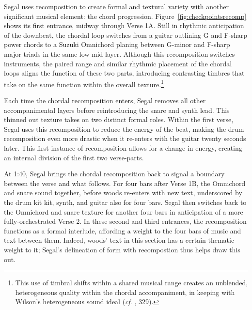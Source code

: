 Segal uses recomposition to create formal and textural variety with another significant musical 
element: the chord progression. Figure~\ref{fig:checkpointsrecomp} shows its first entrance, midway 
through Verse 1A. Still in rhythmic anticipation of the downbeat, the chordal loop switches from a 
guitar outlining G and F-sharp power chords to a Suzuki Omnichord planing between G-minor and F-sharp
major triads in the same low-mid layer. Although this recomposition switches instruments, the paired 
range and similar rhythmic placement of the chordal loops aligns the function of these two parts, 
introducing contrasting timbres that take on the same function within the overall 
texture.\footnote{This use of timbral shifts within a shared musical range creates an unblended,
heterogeneous quality within the chordal accompaniment, in keeping with Wilson's heterogeneous 
sound ideal (\textit{cf}.  \cite{ollywilsonHeterogeneousSoundIdeal1992}, 329).}

Each time the chordal recomposition enters, Segal removes all other accompanimental layers
before reintroducing the snare and synth lead. This thinned out texture takes on two distinct 
formal roles. Within the first verse, Segal uses this recomposition to reduce the energy of the 
beat, making the drum recomposition even more drastic when it re-enters with the guitar twenty 
seconds later. This first instance of recomposition allows for a change in energy, creating an 
internal division of the first two verse-parts.

At 1:40, Segal brings the chordal recomposition back to signal a boundary between the verse and 
what follows. For four bars after Verse 1B, the Omnichord and snare sound together, before woods 
re-enters with new text, underscored by the drum kit kit, synth, and guitar also for four bars. 
Segal then switches back to the Omnichord and snare texture for another four bars in anticipation 
of a more fully-orchestrated Verse 2. In these second and third entrances, the recomposition functions
as a formal interlude, affording a weight to the four bars of music and text between them. Indeed, 
woods' text in this section has a certain thematic weight to it; Segal's delineation of form with
recompostion thus helps draw this out.

